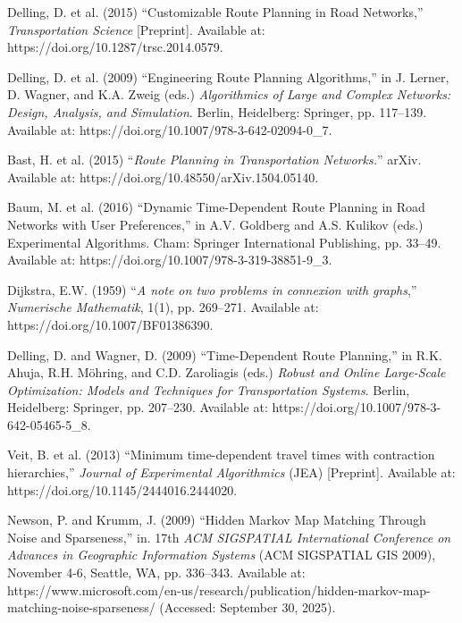 \begin{thebibliography}{99}
    
        Delling, D. et al. (2015) “Customizable Route Planning in Road Networks,” \textit{Transportation Science} [Preprint]. Available at: https://doi.org/10.1287/trsc.2014.0579.

       
        Delling, D. et al. (2009) “Engineering Route Planning Algorithms,” in J. Lerner, D. Wagner, and K.A. Zweig (eds.) \textit{Algorithmics of Large and Complex Networks: Design, Analysis, and Simulation}. Berlin, Heidelberg: Springer, pp. 117–139. Available at: https://doi.org/10.1007/978-3-642-02094-0\_7.

          
        Bast, H. et al. (2015) “\textit{Route Planning in Transportation Networks.}” arXiv. Available at: https://doi.org/10.48550/arXiv.1504.05140.


        Baum, M. et al. (2016) “Dynamic Time-Dependent Route Planning in Road Networks with User Preferences,” in A.V. Goldberg and A.S. Kulikov (eds.) Experimental Algorithms. Cham: Springer International Publishing, pp. 33–49. Available at: https://doi.org/10.1007/978-3-319-38851-9\_3.


        Dijkstra, E.W. (1959) “\textit{A note on two problems in connexion with graphs},” \textit{Numerische Mathematik}, 1(1), pp. 269–271. Available at: https://doi.org/10.1007/BF01386390.

        Delling, D. and Wagner, D. (2009) “Time-Dependent Route Planning,” in R.K. Ahuja, R.H. Möhring, and C.D. Zaroliagis (eds.) \textit{Robust and Online Large-Scale Optimization: Models and Techniques for Transportation Systems}. Berlin, Heidelberg: Springer, pp. 207–230. Available at: https://doi.org/10.1007/978-3-642-05465-5\_8.

        
        
        Veit, B. et al. (2013) “Minimum time-dependent travel times with contraction hierarchies,” \textit{Journal of Experimental Algorithmics} (JEA) [Preprint]. Available at: https://doi.org/10.1145/2444016.2444020.


        Newson, P. and Krumm, J. (2009) “Hidden Markov Map Matching Through Noise and Sparseness,” in. 17th \textit{ACM SIGSPATIAL International Conference on Advances in Geographic Information Systems} (ACM SIGSPATIAL GIS 2009), November 4-6, Seattle, WA, pp. 336–343. Available at: https://www.microsoft.com/en-us/research/publication/hidden-markov-map-matching-noise-sparseness/ (Accessed: September 30, 2025).



\end{thebibliography}
